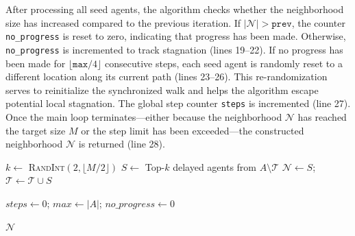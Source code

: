 \documentclass[review]{jair}
\begin{document}
After processing all seed agents, the algorithm checks whether the neighborhood size has increased compared to the previous iteration. If \( |\mathcal{N}| > \texttt{prev} \), the counter \texttt{no\_progress} is reset to zero, indicating that progress has been made. Otherwise, \texttt{no\_progress} is incremented to track stagnation (lines 19--22). 
If no progress has been made for \( \lfloor \texttt{max} / 4 \rfloor \) consecutive steps, each seed agent is randomly reset to a different location along its current path (lines 23--26). This re-randomization serves to reinitialize the synchronized walk and helps the algorithm escape potential local stagnation. The global step counter \texttt{steps} is incremented (line 27).
Once the main loop terminates—either because the neighborhood \( \mathcal{N} \) has reached the target size \( M \) or the step limit has been exceeded—the constructed neighborhood \( \mathcal{N} \) is returned (line 28).

\begin{algorithm}[t]
\caption{Synchronized Random Walk Neighborhood}
\label{alg:srwn}

$k \gets$ \textsc{RandInt}$(2, \lfloor M/2 \rfloor)$\;
$S \gets$ Top-$k$ delayed agents from $A \setminus \mathcal{T}$\;
$\mathcal{N} \gets S$; \quad $\mathcal{T} \gets \mathcal{T} \cup S$\;

$steps \gets 0$; \quad $max \gets |A|$; \quad $no\_progress \gets 0$\;

\Return $\mathcal{N}$\;
\end{algorithm}
\end{document}
